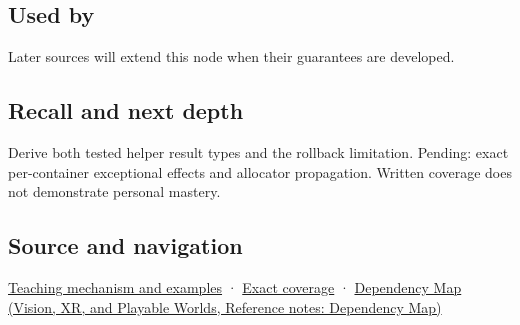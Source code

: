 \subsection{Used by}\label{appendix-c746afaa47d1-used-by}

\hypertarget{appendix-c746afaa47d1-used-by}{}

Later sources will extend this node when their guarantees are developed.

\subsection{Recall and next depth}\label{appendix-c746afaa47d1-recall-and-next-depth}

\hypertarget{appendix-c746afaa47d1-recall-and-next-depth}{}

Derive both tested helper result types and the rollback limitation. Pending: exact per-container exceptional effects and allocator propagation. Written coverage does not demonstrate personal mastery.

\subsection{Source and navigation}\label{appendix-c746afaa47d1-source-and-navigation}

\hypertarget{appendix-c746afaa47d1-source-and-navigation}{}

\hyperref[01-foundations-i-ch003-failure-guarantees-shape-the-transfer-algorithm]{Teaching mechanism and examples} · \hyperref[appendix-fd090d982a15-m009---parts-127-147]{Exact coverage} · \href{../07-Vision-XR-and-Playable-Worlds/main.pdf\#nameddest=appendix-4ad47bdd269a}{Dependency Map (Vision, XR, and Playable Worlds, Reference notes: Dependency Map)}
